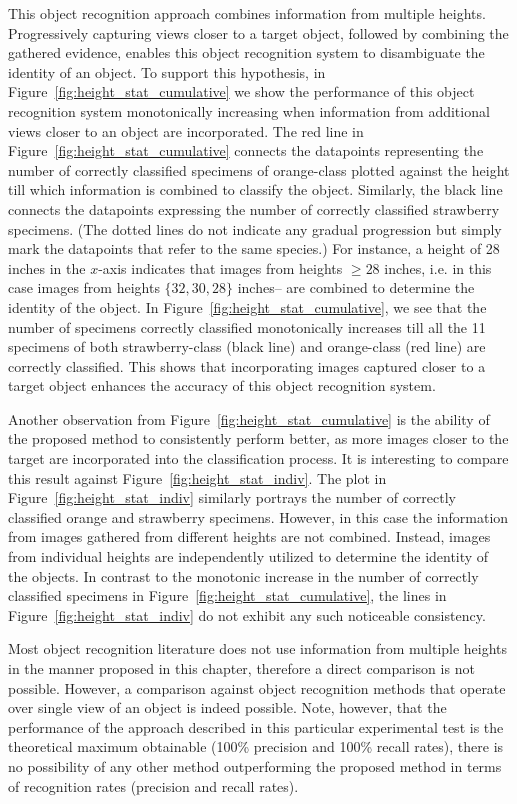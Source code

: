This object recognition approach combines information from multiple heights. Progressively capturing views closer to a target object, followed by combining the gathered evidence, enables this object recognition system to disambiguate the identity of an object. To support this hypothesis, in Figure~\ref{fig:height_stat_cumulative} we show the performance of this object recognition system monotonically increasing when information from additional views closer to an object are incorporated. The red line in Figure~\ref{fig:height_stat_cumulative} connects the datapoints representing the number of correctly classified specimens of orange-class plotted against the height till which information is combined to classify the object. Similarly, the black line connects the datapoints expressing the number of correctly classified strawberry specimens. (The dotted lines do not indicate any gradual progression but simply mark the datapoints that refer to the same species.) For instance, a height of 28 inches in the $x$-axis indicates that images from heights $\geq 28$ inches, i.e. in this case images from heights $\{32, 30, 28\}$ inches-- are combined to determine the identity of the object. In 
Figure~\ref{fig:height_stat_cumulative}, we see that the number of specimens correctly classified monotonically increases till all the 11 specimens of both strawberry-class (black line) and orange-class (red line) are correctly classified. This shows that incorporating images captured closer to a target object enhances the accuracy of this object recognition system. 

Another observation from Figure~\ref{fig:height_stat_cumulative} is the ability of the proposed method to consistently perform better, as more images closer to the target are incorporated into the classification process. It is interesting to compare this result against Figure~\ref{fig:height_stat_indiv}. The plot in Figure~\ref{fig:height_stat_indiv} similarly portrays the number of correctly classified orange and strawberry specimens. However, in this case the information from images gathered from different heights are not combined. Instead, images from individual heights are independently utilized to determine the identity of the objects. In contrast to the monotonic increase in the number of correctly classified specimens in Figure~\ref{fig:height_stat_cumulative}, the lines in Figure~\ref{fig:height_stat_indiv} do not exhibit any such noticeable consistency.

Most object recognition literature does not use information from multiple heights in the manner proposed in this chapter, therefore a direct comparison is not possible. However, a comparison against object recognition methods that operate over single view of an object is indeed possible. Note, however, that the performance of the approach described in this particular experimental test is the theoretical maximum obtainable (100\% precision and 100\% recall rates), there is no possibility of any other method outperforming the proposed method in terms of recognition rates (precision and recall rates).

